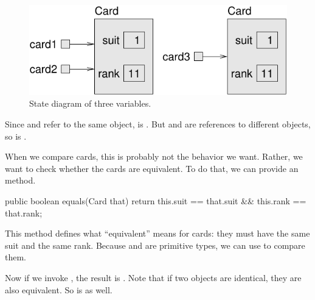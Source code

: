 \begin{figure}[!ht]
\begin{center}
\includegraphics{figs/card.pdf}
\caption{State diagram of three  variables.}
\label{fig.card}
\end{center}
\end{figure}

Since  and  refer to the same object,  is .
But  and  are references to different objects, so  is .

When we compare cards, this is probably not the behavior we want.
Rather, we want to check whether the cards are equivalent.
To do that, we can provide an  method.


\begin{code}
public boolean equals(Card that) {
    return this.suit == that.suit && this.rank == that.rank;
}
\end{code}

This method defines what ``equivalent'' means for cards: they must have the same suit and the same rank.
Because  and  are primitive types, we can use \java{==} to compare them.

Now if we invoke , the result is .
Note that if two objects are identical, they are also equivalent.
So  is  as well.
